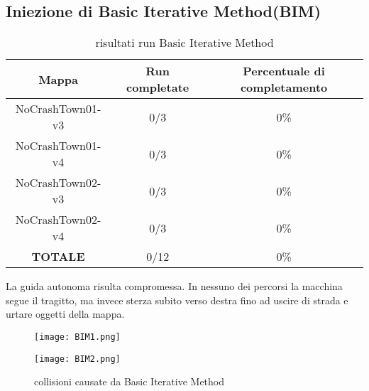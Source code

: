 \subsection{Iniezione di Basic Iterative Method(BIM)}
\begin{table}[h]
    \begin{tabular}{|c|c|c|}
        \hline
        Mappa                   & Run completate & Percentuale di completamento\\
        \hline
        NoCrashTown01-v3        & 0/3            & 0\% \\
        NoCrashTown01-v4        & 0/3            & 0\% \\
        NoCrashTown02-v3        & 0/3            & 0\% \\
        NoCrashTown02-v4        & 0/3            & 0\%  \\
        \hline
        \textbf{TOTALE}                  & 0/12           & 0\% \\
        \hline
    \end{tabular}
    \caption{risultati run Basic Iterative Method}
    \label{tab:bim}
\end{table}
La guida autonoma risulta compromessa. In nessuno dei percorsi la macchina segue il tragitto, ma invece sterza subito verso destra fino ad uscire di strada
e urtare oggetti della mappa.
\begin{figure}[h]
    \centering
    \parbox{5cm}{
    \texttt{[image: BIM1.png]}
    \label{fig:bim1}}
    \qquad
    \begin{minipage}{5cm}
    \texttt{[image: BIM2.png]}
    \label{fig:bim2}
    \end{minipage}
    \caption{collisioni causate da Basic Iterative Method}
    \label{fig:bimrun}
    \end{figure}
\newpage
